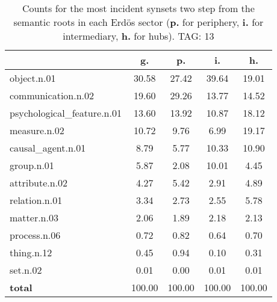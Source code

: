 \begin{table}[h!]
\begin{center}
\begin{tabular}{| l || c | c | c | c |}\hline
 & {\bf g.} & {\bf p.} & {\bf i.} & {\bf h.} \\\hline\hline
object.n.01 & 30.58  & 27.42  & 39.64  & 19.01 \\\hline
communication.n.02 & 19.60  & 29.26  & 13.77  & 14.52 \\\hline
psychological\_feature.n.01 & 13.60  & 13.92  & 10.87  & 18.12 \\\hline
measure.n.02 & 10.72  & 9.76  & 6.99  & 19.17 \\\hline
causal\_agent.n.01 & 8.79  & 5.77  & 10.33  & 10.90 \\\hline
group.n.01 & 5.87  & 2.08  & 10.01  & 4.45 \\\hline
attribute.n.02 & 4.27  & 5.42  & 2.91  & 4.89 \\\hline
relation.n.01 & 3.34  & 2.73  & 2.55  & 5.78 \\\hline
matter.n.03 & 2.06  & 1.89  & 2.18  & 2.13 \\\hline
process.n.06 & 0.72  & 0.82  & 0.64  & 0.70 \\\hline
thing.n.12 & 0.45  & 0.94  & 0.10  & 0.31 \\\hline
set.n.02 & 0.01  & 0.00  & 0.01  & 0.01 \\\hline\hline
{{\bf total}} & 100.00  & 100.00  & 100.00  & 100.00 \\\hline
\end{tabular}
\caption{Counts for the most incident synsets two step from the semantic roots in each Erd\"os sector ({\bf p.} for periphery, {\bf i.} for intermediary, {\bf h.} for hubs). TAG: 13}
\end{center}
\end{table}